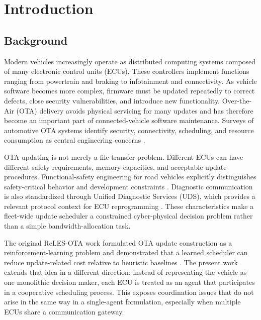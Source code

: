 \documentclass{iutbscthesis}
\begin{document}

\chapter{Introduction}

\section{Background}
Modern vehicles increasingly operate as distributed computing systems composed of many electronic control units (ECUs). These controllers implement functions ranging from powertrain and braking to infotainment and connectivity. As vehicle software becomes more complex, firmware must be updated repeatedly to correct defects, close security vulnerabilities, and introduce new functionality. Over-the-Air (OTA) delivery avoids physical servicing for many updates and has therefore become an important part of connected-vehicle software maintenance. Surveys of automotive OTA systems identify security, connectivity, scheduling, and resource consumption as central engineering concerns \parencite{halder2020survey,ghosal2022stride}.

OTA updating is not merely a file-transfer problem. Different ECUs can have different safety requirements, memory capacities, and acceptable update procedures. Functional-safety engineering for road vehicles explicitly distinguishes safety-critical behavior and development constraints \parencite{iso26262}. Diagnostic communication is also standardized through Unified Diagnostic Services (UDS), which provides a relevant protocol context for ECU reprogramming \parencite{iso14229}. These characteristics make a fleet-wide update scheduler a constrained cyber-physical decision problem rather than a simple bandwidth-allocation task.

The original ReLES-OTA work formulated OTA update construction as a reinforcement-learning problem and demonstrated that a learned scheduler can reduce update-related cost relative to heuristic baselines \parencite{bhattacharjee2025relesota}. The present work extends that idea in a different direction: instead of representing the vehicle as one monolithic decision maker, each ECU is treated as an agent that participates in a cooperative scheduling process. This exposes coordination issues that do not arise in the same way in a single-agent formulation, especially when multiple ECUs share a communication gateway.
\end{document}
